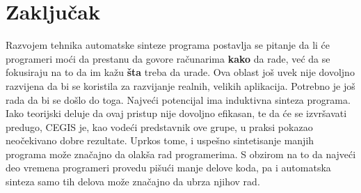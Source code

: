 \section{Zaključak}
\label{sec:zakljucak}

Razvojem tehnika automatske sinteze programa postavlja se pitanje da li će programeri moći da prestanu da govore računarima \textbf{kako} da rade, već da se fokusiraju na to da im kažu \textbf{šta} treba da urade. Ova oblast još uvek nije dovoljno razvijena da bi se koristila za razvijanje realnih, velikih aplikacija. Potrebno je još rada da bi se došlo do toga. Najveći potencijal ima induktivna sinteza programa.
Iako teorijski deluje da ovaj pristup nije dovoljno efikasan, te da će se izvršavati predugo, CEGIS je, kao vodeći predstavnik ove grupe, u praksi pokazao neočekivano dobre rezultate. Uprkos tome, i uspešno sintetisanje manjih programa može značajno da olakša rad programerima. S obzirom na to da najveći deo vremena programeri provedu pišući manje delove koda, pa i automatska sinteza samo tih delova može značajno da ubrza njihov rad.
